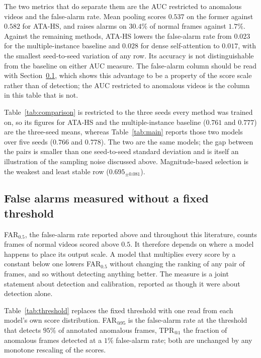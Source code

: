 \documentclass[11pt]{article}
\begin{document}
The two metrics that do separate them are the AUC restricted to anomalous videos
and the false-alarm rate. Mean pooling scores $0.537$ on the former against
$0.582$ for ATA-HS, and raises alarms on $30.4\%$ of normal frames against
$1.7\%$. Against the remaining methods, ATA-HS lowers the false-alarm rate from
$0.023$ for the multiple-instance baseline and $0.028$ for dense self-attention
to $0.017$, with the smallest seed-to-seed variation of any row. Its accuracy is
not distinguishable from the baseline on either AUC measure. The false-alarm
column should be read with Section~\ref{sec:threshold}, which shows this
advantage to be a property of the score scale rather than of detection; the
AUC restricted to anomalous videos is the column in this table that is not.

Table~\ref{tab:comparison} is restricted to the three seeds every method was
trained on, so its figures for ATA-HS and the multiple-instance baseline
($0.761$ and $0.777$) are the three-seed means, whereas Table~\ref{tab:main}
reports those two models over five seeds ($0.766$ and $0.778$). The two are the
same models; the gap between the pairs is smaller than one seed-to-seed standard
deviation and is itself an illustration of the sampling noise discussed above. Magnitude-based selection
is the weakest and least stable row ($0.695_{\pm0.081}$).



\subsection{False alarms measured without a fixed threshold}
\label{sec:threshold}

FAR$_{0.5}$, the false-alarm rate reported above and throughout this literature,
counts frames of normal videos scored above $0.5$. It therefore depends on where
a model happens to place its output scale. A model that multiplies every score by
a constant below one lowers FAR$_{0.5}$ without changing the ranking of any pair
of frames, and so without detecting anything better. The measure is a joint
statement about detection and calibration, reported as though it were about
detection alone.

Table~\ref{tab:threshold} replaces the fixed threshold with one read from each
model's own score distribution. FAR$_{@95}$ is the false-alarm rate at the
threshold that detects $95\%$ of annotated anomalous frames, TPR$_{@1}$ the
fraction of anomalous frames detected at a $1\%$ false-alarm rate; both are
unchanged by any monotone rescaling of the scores.
\end{document}
